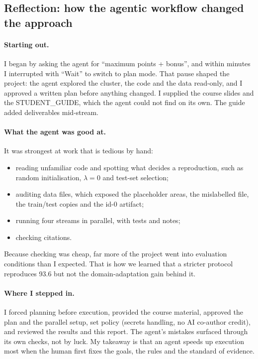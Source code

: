 \subsection{Reflection: how the agentic workflow changed the approach}\label{sec:reflection}

\paragraph{Starting out.} I began by asking the agent for ``maximum points + bonus'', and within minutes I interrupted with ``Wait'' to switch to plan mode.
That pause shaped the project: the agent explored the cluster, the code and the data read-only, and I approved a written plan before anything changed.
I supplied the course slides and the STUDENT\_GUIDE, which the agent could not find on its own. The guide added deliverables mid-stream.

\paragraph{What the agent was good at.} It was strongest at work that is tedious by hand:
\begin{itemize}[leftmargin=*]
  \item reading unfamiliar code and spotting what decides a reproduction, such as random initialisation, $\lambda=0$ and test-set selection;
  \item auditing data files, which exposed the placeholder areas, the mislabelled file, the train/test copies and the id-0 artifact;
  \item running four streams in parallel, with tests and notes;
  \item checking citations.
\end{itemize}
Because checking was cheap, far more of the project went into evaluation conditions than I expected. That is how we learned that a stricter protocol reproduces 93.6 but not the domain-adaptation gain behind it.

\paragraph{Where I stepped in.} I forced planning before execution, provided the course material, approved the plan and the parallel setup, set policy (secrets handling, no AI co-author credit), and reviewed the results and this report.
The agent's mistakes surfaced through its own checks, not by luck. My takeaway is that an agent speeds up execution most when the human first fixes the goals, the rules and the standard of evidence.
